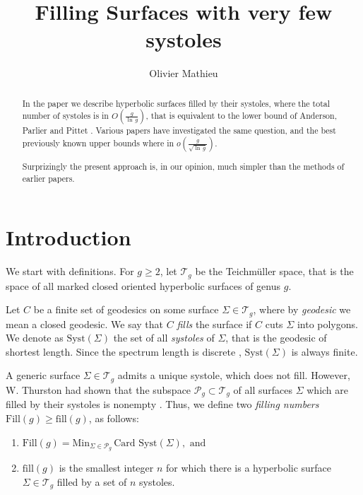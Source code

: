 \documentclass[12pt]{amsart}
\author{Olivier Mathieu}
\title{Filling Surfaces with very few systoles}
\date{}
\newcommand{\Card}{\mathrm{Card\,}}
\renewcommand{\fill}{\mathrm{fill}}
\newcommand{\Fill}{\mathrm{Fill}}
\newcommand{\Min}{\mathrm{Min}}
\newcommand{\Syst}{{\mathrm {Syst}}}
\newcommand{\cP}{\mathcal{P}}
\newcommand{\cT}{\mathcal{T}}
\begin{document}
\begin{abstract} In the paper we describe hyperbolic surfaces filled by their systoles, where the total number of systoles is in $O(\frac{g}{\ln \,g})$, that is
equivalent  to the lower bound of Anderson, Parlier and Pittet
\cite{APP}. 
Various papers \cite{SS}\cite{FB20}\cite{Sanki}\cite{ IM}\cite{ Mathieu} have investigated the same question, and the best previously known upper bounds where in $o(\frac{g}{{\sqrt{\ln \,g}}})$. 

Surprizingly  the present approach is, in our opinion, much simpler than the 
methods of earlier papers.
\end{abstract}



\maketitle


\section*{Introduction}
We start with  definitions. For $g\geq 2$, let  $\cT_g$ be the Teichm\"uller space, that is the space of all marked closed oriented hyperbolic surfaces of genus $g$. 

 Let $C$ be a finite set of geodesics on some surface $\Sigma\in \cT_g$,
where by {\it geodesic} we mean a closed geodesic.
 We say that $C$ {\it fills} the surface if $C$ cuts $\Sigma$ into polygons.
We denote as $\Syst(\Sigma)$  the set of all
{\it systoles} of $\Sigma$, that is the geodesic of shortest length.
Since the spectrum length is discrete \cite{Buser},  $\Syst(\Sigma)$ is always finite.

A generic surface  $\Sigma\in \cT_g$ admits a unique systole,  
which does not fill. However, W. Thurston had shown that the subspace $\cP_g\subset \cT_g$ of all  surfaces $\Sigma$  which are filled by their systoles is nonempty \cite{T85}. Thus, we define two  {\it filling numbers}
$\Fill(g)\geq \fill(g)$, as follows:

\begin{enumerate}
\item[(a)] $\Fill(g)=\Min_{\Sigma\in \cP_g}\,\Card\,\Syst(\Sigma), \text{ and}$

\item[(b)]$\fill(g)$ is the smallest integer $n$ for which there is 
a hyperbolic surface  $\Sigma\in\cT_g$ filled   by a set of $n$ systoles.
\end{enumerate}
\end{document}
